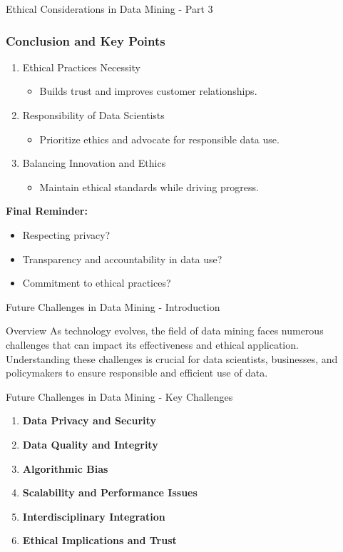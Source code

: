 \documentclass[aspectratio=169]{beamer}
\begin{document}
\begin{frame}[fragile]{Ethical Considerations in Data Mining - Part 3}
    \frametitle{Conclusion and Key Points}
    \begin{enumerate}
        \item Ethical Practices Necessity
            \begin{itemize}
                \item Builds trust and improves customer relationships.
            \end{itemize}
        \item Responsibility of Data Scientists
            \begin{itemize}
                \item Prioritize ethics and advocate for responsible data use.
            \end{itemize}
        \item Balancing Innovation and Ethics
            \begin{itemize}
                \item Maintain ethical standards while driving progress.
            \end{itemize}
    \end{enumerate}
    
    \textbf{Final Reminder:}
    \begin{itemize}
        \item Respecting privacy?
        \item Transparency and accountability in data use?
        \item Commitment to ethical practices?
    \end{itemize}
\end{frame}

\begin{frame}[fragile]{Future Challenges in Data Mining - Introduction}
    \begin{block}{Overview}
        As technology evolves, the field of data mining faces numerous challenges that can impact its effectiveness and ethical application. Understanding these challenges is crucial for data scientists, businesses, and policymakers to ensure responsible and efficient use of data.
    \end{block}
\end{frame}

\begin{frame}[fragile]{Future Challenges in Data Mining - Key Challenges}
    \begin{enumerate}
        \item \textbf{Data Privacy and Security}
        \item \textbf{Data Quality and Integrity}
        \item \textbf{Algorithmic Bias}
        \item \textbf{Scalability and Performance Issues}
        \item \textbf{Interdisciplinary Integration}
        \item \textbf{Ethical Implications and Trust}
    \end{enumerate}
\end{frame}
\end{document}
